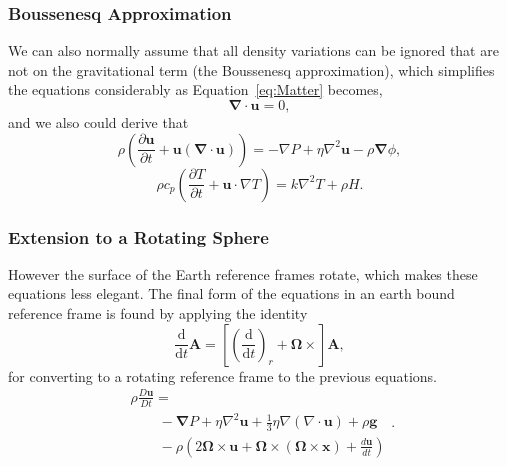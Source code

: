 \subsubsection{Boussenesq Approximation}
We can also normally assume that all density variations can be ignored that
 are not on the gravitational term (the Boussenesq approximation),
  which simplifies the equations considerably as Equation~\ref{eq:Matter} becomes,
\begin{equation}
    \boldsymbol{\nabla}\cdot\mathbf{u} = 0, \tag{B-Matter}
\end{equation}
and we also could derive that
\begin{equation}
\rho\left (\frac{\partial \mathbf{u}}{\partial t}
+ \mathbf{u}(\boldsymbol{\nabla}\cdot \mathbf{u})\right)=
-\nabla P+\eta \nabla^{2} \mathbf{u}-\rho \boldsymbol{\nabla}\phi, \tag{B-Momentum}
\end{equation}
\begin{equation}
\rho c_{p}\left(\frac{\partial T}{\partial t}
+\mathbf{u} \cdot \nabla T\right)=k \nabla^{2} T+\rho H. \tag{B-Energy}
\end{equation}

\subsubsection{Extension to a Rotating Sphere}
\label{app:rotating_equations}
However the surface of the Earth reference frames rotate,
 which makes these equations less elegant.
  The final form of the equations in an earth bound reference frame
  is found by applying the identity
\begin{equation}
\frac{\mathrm{d}}{\mathrm{d} t} \boldsymbol{A}=
\left[\left(\frac{\mathrm{d}}{\mathrm{d} t}\right)_{r}
+\mathbf{\Omega} \times\right] \boldsymbol{A},
\end{equation}
for converting to a rotating reference frame to the previous equations.
\begin{equation}
\begin{array}{l}
\rho \frac{D \mathbf{u}}{D t}=\\\quad\quad-\boldsymbol{\nabla} P+
\eta \nabla^{2} \mathbf{u}+\frac{1}{3} \eta \nabla(\nabla \cdot \mathbf{u})
+\rho \mathbf{g}\\\quad\quad-\rho\left(2 \mathbf{\Omega} \times \mathbf{u}
+\mathbf{\Omega} \times(\mathbf{\Omega} \times \mathbf{x})
+\frac{d \mathbf{u}}{d t}\right)\end{array}.
\tag{R-Momentum}
\end{equation}

